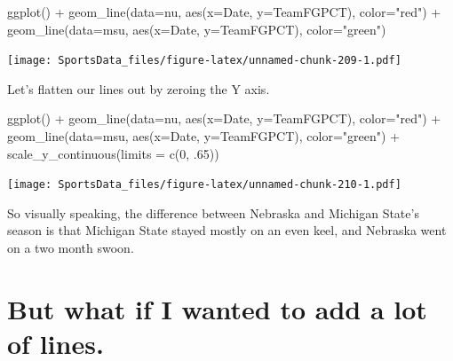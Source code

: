 \documentclass[
]{book}
\newenvironment{Shaded}{\begin{snugshade}}{\end{snugshade}}
\newcommand{\AttributeTok}[1]{\textcolor[rgb]{0.77,0.63,0.00}{#1}}
\newcommand{\DecValTok}[1]{\textcolor[rgb]{0.00,0.00,0.81}{#1}}
\newcommand{\FunctionTok}[1]{\textcolor[rgb]{0.00,0.00,0.00}{#1}}
\newcommand{\NormalTok}[1]{#1}
\newcommand{\SpecialCharTok}[1]{\textcolor[rgb]{0.00,0.00,0.00}{#1}}
\newcommand{\StringTok}[1]{\textcolor[rgb]{0.31,0.60,0.02}{#1}}
\begin{document}
\begin{Shaded}
\begin{Highlighting}[]
\FunctionTok{ggplot}\NormalTok{() }\SpecialCharTok{+} 
  \FunctionTok{geom\_line}\NormalTok{(}\AttributeTok{data=}\NormalTok{nu, }\FunctionTok{aes}\NormalTok{(}\AttributeTok{x=}\NormalTok{Date, }\AttributeTok{y=}\NormalTok{TeamFGPCT), }\AttributeTok{color=}\StringTok{"red"}\NormalTok{) }\SpecialCharTok{+} 
  \FunctionTok{geom\_line}\NormalTok{(}\AttributeTok{data=}\NormalTok{msu, }\FunctionTok{aes}\NormalTok{(}\AttributeTok{x=}\NormalTok{Date, }\AttributeTok{y=}\NormalTok{TeamFGPCT), }\AttributeTok{color=}\StringTok{"green"}\NormalTok{)}
\end{Highlighting}
\end{Shaded}

\texttt{[image: SportsData\_files/figure-latex/unnamed-chunk-209-1.pdf]}

Let's flatten our lines out by zeroing the Y axis.

\begin{Shaded}
\begin{Highlighting}[]
\FunctionTok{ggplot}\NormalTok{() }\SpecialCharTok{+} 
  \FunctionTok{geom\_line}\NormalTok{(}\AttributeTok{data=}\NormalTok{nu, }\FunctionTok{aes}\NormalTok{(}\AttributeTok{x=}\NormalTok{Date, }\AttributeTok{y=}\NormalTok{TeamFGPCT), }\AttributeTok{color=}\StringTok{"red"}\NormalTok{) }\SpecialCharTok{+} 
  \FunctionTok{geom\_line}\NormalTok{(}\AttributeTok{data=}\NormalTok{msu, }\FunctionTok{aes}\NormalTok{(}\AttributeTok{x=}\NormalTok{Date, }\AttributeTok{y=}\NormalTok{TeamFGPCT), }\AttributeTok{color=}\StringTok{"green"}\NormalTok{) }\SpecialCharTok{+} 
  \FunctionTok{scale\_y\_continuous}\NormalTok{(}\AttributeTok{limits =} \FunctionTok{c}\NormalTok{(}\DecValTok{0}\NormalTok{, .}\DecValTok{65}\NormalTok{))}
\end{Highlighting}
\end{Shaded}

\texttt{[image: SportsData\_files/figure-latex/unnamed-chunk-210-1.pdf]}

So visually speaking, the difference between Nebraska and Michigan State's season is that Michigan State stayed mostly on an even keel, and Nebraska went on a two month swoon.

\hypertarget{but-what-if-i-wanted-to-add-a-lot-of-lines.}{%
\section{But what if I wanted to add a lot of lines.}\label{but-what-if-i-wanted-to-add-a-lot-of-lines.}}
\end{document}
